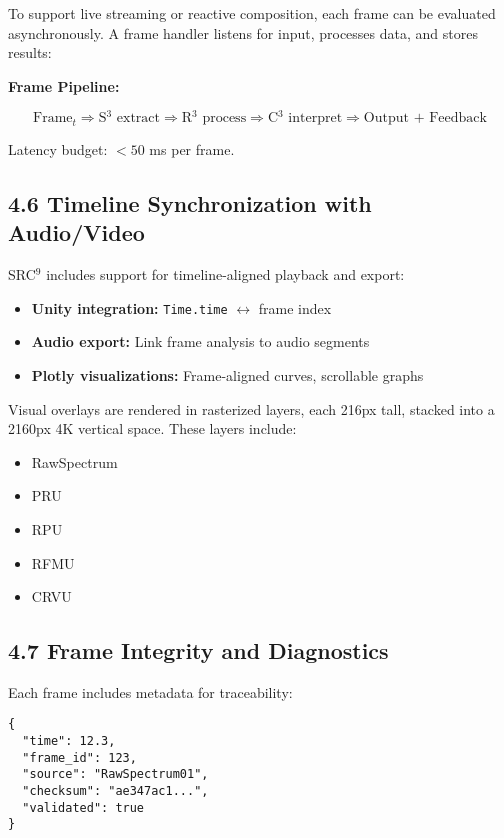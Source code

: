 \documentclass[10pt]{article}
\begin{document}
To support live streaming or reactive composition, each frame can be evaluated asynchronously. A frame handler listens for input, processes data, and stores results:

\textbf{Frame Pipeline:}

\[
\text{Frame}_t \Rightarrow \text{S$^3$ extract} \Rightarrow \text{R$^3$ process} \Rightarrow \text{C$^3$ interpret} \Rightarrow \text{Output + Feedback}
\]

Latency budget: $< 50$ ms per frame.

\subsection*{4.6 Timeline Synchronization with Audio/Video}

SRC$^9$ includes support for timeline-aligned playback and export:

\begin{itemize}
    \item \textbf{Unity integration:} \texttt{Time.time} $\leftrightarrow$ frame index
    \item \textbf{Audio export:} Link frame analysis to audio segments
    \item \textbf{Plotly visualizations:} Frame-aligned curves, scrollable graphs
\end{itemize}

Visual overlays are rendered in rasterized layers, each 216px tall, stacked into a 2160px 4K vertical space. These layers include:

\begin{itemize}
    \item RawSpectrum
    \item PRU
    \item RPU
    \item RFMU
    \item CRVU
\end{itemize}

\subsection*{4.7 Frame Integrity and Diagnostics}

Each frame includes metadata for traceability:

\begin{verbatim}
{
  "time": 12.3,
  "frame_id": 123,
  "source": "RawSpectrum01",
  "checksum": "ae347ac1...",
  "validated": true
}
\end{verbatim}
\end{document}
